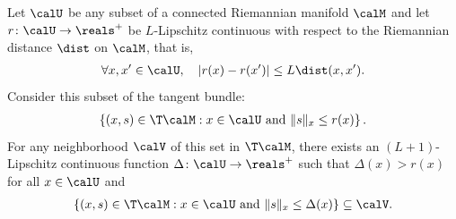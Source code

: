 \begin{lemma} \label{lem:neighborhoodballsTM}
	Let $\calU$ be any subset of a connected Riemannian manifold $\calM$ and let $r \colon \calU \to \reals^+$ be $L$-Lipschitz continuous with respect to the Riemannian distance $\dist$ on $\calM$, that is, %
	\begin{align*}
	\forall x, x' \in \calU, \quad |r(x) - r(x')| \leq L \dist(x, x').
	\end{align*}
	Consider this subset of the tangent bundle:
	\begin{align*}
	\left\{ (x, s) \in \T\calM : x \in \calU \textrm{ and } \|s\|_x \leq r(x) \right\}.
	\end{align*}
	For any neighborhood $\calV$ of this set in $\T\calM$, there exists an $(L+1)$-Lipschitz continuous function $\Delta \colon \calU \to \reals^+$ such that $\Delta(x) > r(x)$ for all $x \in \calU$ and
	\begin{align*}
	\left\{ (x, s) \in \T\calM : x \in \calU \textrm{ and } \|s\|_x \leq \Delta(x) \right\} \subseteq \calV.
	\end{align*}
\end{lemma}
